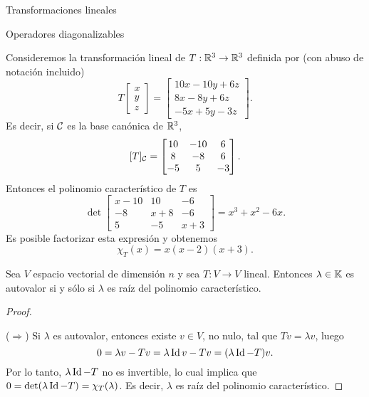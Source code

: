 \begin{chapter}{Transformaciones lineales}
\begin{section}{Operadores diagonalizables}
    
    
        
        \begin{ejemplo} \label{ej-autovectores}
            Consideremos la transformación lineal de $T:\mathbb R^3 \to \mathbb R^3$  definida por (con abuso de notación incluido)
            \begin{equation*}
                T
                \begin{bmatrix} x\\y\\z \end{bmatrix} =
                \begin{bmatrix} 10x-10y+6z\\8x -8y +6z \\-5x+5y-3z\end{bmatrix}.
            \end{equation*}
            Es decir,  si $\mathcal{C}$ es la base canónica de $\mathbb R^3$, 
            $$ 
            [T]_{\mathcal{C}}=\begin{bmatrix}10&-10&6\\8& -8& 6\\-5& 5& -3\end{bmatrix}.
            $$
            Entonces el  polinomio característico de $T$ es
            $$
            \det \begin{bmatrix}x-10&10&-6\\-8& x+8& -6\\5& -5& x+3\end{bmatrix} = x^3  + x^2 - 6 x .
            $$
            Es posible factorizar esta expresión y obtenemos
            $$
            \chi_T(x) = x (x-2)(x+3).
            $$
        \end{ejemplo}
        
        
        \begin{proposicion}\label{autovalores}
            Sea $V$ espacio vectorial de dimensión $n$ y sea $T: V \to V$ lineal. Entonces $\lambda\in \mathbb K$ es autovalor si y sólo si $\lambda$ es raíz del polinomio característico.  
        \end{proposicion}
        \begin{proof}${}^{}$
            
            ($\Rightarrow$) Si $\lambda$ es autovalor, entonces existe $v \in V$, no nulo, tal que $Tv = \lambda v$, luego 
            $$
            0 = \lambda v -Tv  =   \lambda \operatorname{Id} v - Tv  =  (\lambda \operatorname{Id}-T)v.
            $$
            Por lo tanto, $\lambda \operatorname{Id}-T$ no es invertible, lo cual implica que $0 = \det(\lambda \operatorname{Id}-T) = \chi_T(\lambda)$. Es decir, $\lambda$ es raíz del polinomio característico. 
            

\end{proof}
\end{section}
\end{chapter}
